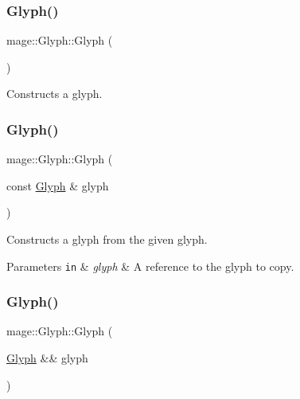 \subsubsection{\texorpdfstring{Glyph()}{Glyph()}\hspace{0.1cm}{\footnotesize\ttfamily [1/3]}}
{\footnotesize\ttfamily mage\+::\+Glyph\+::\+Glyph (\begin{DoxyParamCaption}{ }\end{DoxyParamCaption})\hspace{0.3cm}{\ttfamily [default]}}

Constructs a glyph. \hypertarget{structmage_1_1_glyph_a0ab4ca5253ac80f8849c7d56c0301d61}{}\label{structmage_1_1_glyph_a0ab4ca5253ac80f8849c7d56c0301d61} 
\subsubsection{\texorpdfstring{Glyph()}{Glyph()}\hspace{0.1cm}{\footnotesize\ttfamily [2/3]}}
{\footnotesize\ttfamily mage\+::\+Glyph\+::\+Glyph (\begin{DoxyParamCaption}\item[{const \hyperlink{structmage_1_1_glyph}{Glyph} \&}]{glyph }\end{DoxyParamCaption})\hspace{0.3cm}{\ttfamily [default]}}

Constructs a glyph from the given glyph.


\begin{DoxyParams}[1]{Parameters}
\mbox{\tt in}  & {\em glyph} & A reference to the glyph to copy. \\
\hline
\end{DoxyParams}
\hypertarget{structmage_1_1_glyph_a4b7ae94678d53ff2978635321e8f1144}{}\label{structmage_1_1_glyph_a4b7ae94678d53ff2978635321e8f1144} 
\subsubsection{\texorpdfstring{Glyph()}{Glyph()}\hspace{0.1cm}{\footnotesize\ttfamily [3/3]}}
{\footnotesize\ttfamily mage\+::\+Glyph\+::\+Glyph (\begin{DoxyParamCaption}\item[{\hyperlink{structmage_1_1_glyph}{Glyph} \&\&}]{glyph }\end{DoxyParamCaption})\hspace{0.3cm}{\ttfamily [default]}}

